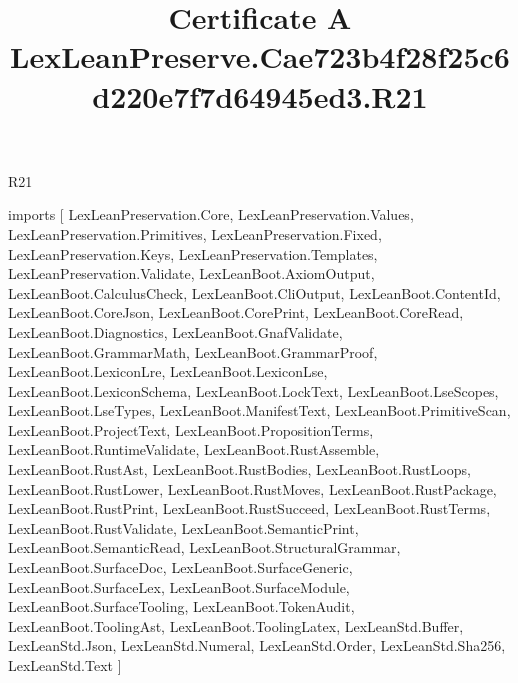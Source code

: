 \begin{lexlean}{R21}
\title{Certificate A LexLeanPreserve.Cae723b4f28f25c6d220e7f7d64945ed3.R21}
\begin{coremodule}
imports [
  LexLeanPreservation.Core,
  LexLeanPreservation.Values,
  LexLeanPreservation.Primitives,
  LexLeanPreservation.Fixed,
  LexLeanPreservation.Keys,
  LexLeanPreservation.Templates,
  LexLeanPreservation.Validate,
  LexLeanBoot.AxiomOutput,
  LexLeanBoot.CalculusCheck,
  LexLeanBoot.CliOutput,
  LexLeanBoot.ContentId,
  LexLeanBoot.CoreJson,
  LexLeanBoot.CorePrint,
  LexLeanBoot.CoreRead,
  LexLeanBoot.Diagnostics,
  LexLeanBoot.GnafValidate,
  LexLeanBoot.GrammarMath,
  LexLeanBoot.GrammarProof,
  LexLeanBoot.LexiconLre,
  LexLeanBoot.LexiconLse,
  LexLeanBoot.LexiconSchema,
  LexLeanBoot.LockText,
  LexLeanBoot.LseScopes,
  LexLeanBoot.LseTypes,
  LexLeanBoot.ManifestText,
  LexLeanBoot.PrimitiveScan,
  LexLeanBoot.ProjectText,
  LexLeanBoot.PropositionTerms,
  LexLeanBoot.RuntimeValidate,
  LexLeanBoot.RustAssemble,
  LexLeanBoot.RustAst,
  LexLeanBoot.RustBodies,
  LexLeanBoot.RustLoops,
  LexLeanBoot.RustLower,
  LexLeanBoot.RustMoves,
  LexLeanBoot.RustPackage,
  LexLeanBoot.RustPrint,
  LexLeanBoot.RustSucceed,
  LexLeanBoot.RustTerms,
  LexLeanBoot.RustValidate,
  LexLeanBoot.SemanticPrint,
  LexLeanBoot.SemanticRead,
  LexLeanBoot.StructuralGrammar,
  LexLeanBoot.SurfaceDoc,
  LexLeanBoot.SurfaceGeneric,
  LexLeanBoot.SurfaceLex,
  LexLeanBoot.SurfaceModule,
  LexLeanBoot.SurfaceTooling,
  LexLeanBoot.TokenAudit,
  LexLeanBoot.ToolingAst,
  LexLeanBoot.ToolingLatex,
  LexLeanStd.Buffer,
  LexLeanStd.Json,
  LexLeanStd.Numeral,
  LexLeanStd.Order,
  LexLeanStd.Sha256,
  LexLeanStd.Text
]


\end{coremodule}
\end{lexlean}
